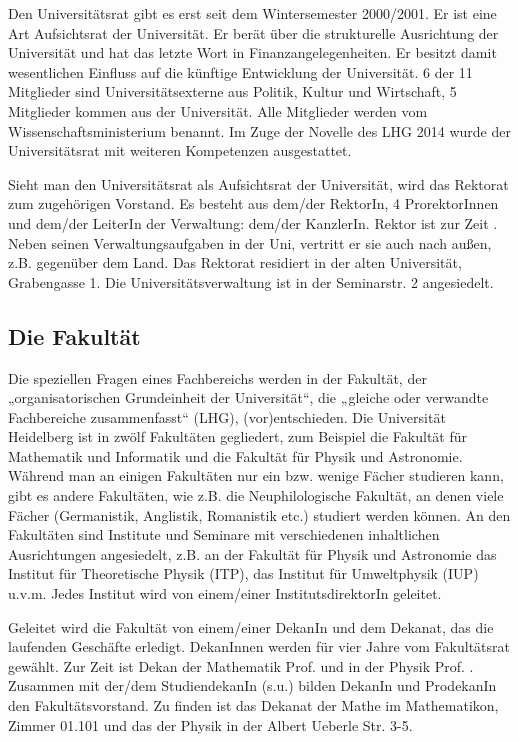 Den Universitätsrat gibt es erst seit dem Wintersemester 2000/2001. Er ist
eine Art Aufsichtsrat der Universität. Er berät über die strukturelle
Ausrichtung der Universität und hat das letzte Wort in
Finanzangelegenheiten. Er besitzt damit wesentlichen Einfluss auf die
künftige Entwicklung der Universität. 6 der 11 Mitglieder sind
Universitätsexterne aus Politik, Kultur und Wirtschaft, 5 Mitglieder
kommen aus der Universität. Alle Mitglieder werden vom
Wissenschaftsministerium benannt. Im Zuge der Novelle des LHG 2014 wurde
der Universitätsrat mit weiteren Kompetenzen ausgestattet.

Sieht man den Universitätsrat als Aufsichtsrat der Universität, wird das
Rektorat zum zugehörigen Vorstand. Es besteht aus dem/der RektorIn, 4
ProrektorInnen und dem/der LeiterIn der Verwaltung: dem/der KanzlerIn.
Rektor ist zur Zeit \rektor . Neben seinen Verwaltungsaufgaben in
der Uni, vertritt er sie auch nach außen, z.B. gegenüber dem Land. Das
Rektorat residiert in der alten Universität, Grabengasse 1. Die
Universitätsverwaltung ist in der Seminarstr. 2 angesiedelt.

\subsection{Die Fakultät}

Die speziellen Fragen eines Fachbereichs werden in der Fakultät, der
„organisatorischen Grundeinheit der Universität“, die „gleiche oder
verwandte Fachbereiche zusammenfasst“ (LHG), (vor)entschieden. Die
Universität Heidelberg ist in zwölf Fakultäten gegliedert, zum Beispiel 
die Fakultät für Mathematik und Informatik und die Fakultät für Physik und 
Astronomie. Während man an einigen Fakultäten nur ein bzw. wenige Fächer studieren
kann, gibt es andere Fakultäten, wie z.B. die Neuphilologische Fakultät,
an denen viele Fächer (Germanistik, Anglistik, Romanistik etc.) studiert
werden können. An den Fakultäten sind Institute und Seminare mit verschiedenen inhaltlichen Ausrichtungen angesiedelt, z.B. an der Fakultät für Physik und Astronomie das Institut für Theoretische Physik (ITP), das Institut für Umweltphysik (IUP) u.v.m. Jedes Institut wird von einem/einer InstitutsdirektorIn geleitet.

Geleitet wird die Fakultät von einem/einer DekanIn und dem Dekanat, das die laufenden Geschäfte erledigt. DekanInnen werden für vier Jahre vom Fakultätsrat gewählt. Zur Zeit ist Dekan der Mathematik Prof. \dekanmathe{} und in der Physik Prof. \dekanphysik. Zusammen mit der/dem
StudiendekanIn (s.u.) bilden DekanIn und ProdekanIn den Fakultätsvorstand. Zu finden ist das Dekanat der Mathe im \Gls{Mathematikon}, Zimmer 01.101 und das der Physik in der Albert Ueberle Str. 3-5.

